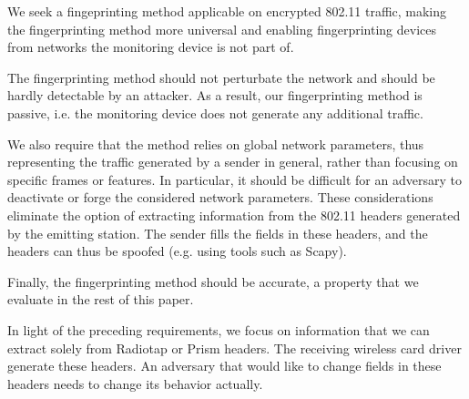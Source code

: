 \documentclass[10pt, conference, compsocconf, letterpaper]{IEEEtran}
\begin{document}
We seek a fingeprinting method applicable on encrypted 802.11 traffic, making the fingerprinting method more universal and enabling fingerprinting devices from networks the monitoring device is not part of.

The fingerprinting method should not perturbate the network and should be hardly detectable by an attacker. As a result, our fingerprinting method is passive, i.e. the monitoring device does not generate any additional traffic. 


We also require that the method relies on global network parameters, thus representing the traffic generated by a sender in general, rather than focusing on specific frames or features. In particular, it should be difficult for an adversary to deactivate or forge the considered network parameters. These considerations eliminate the option of extracting information from the 802.11 headers generated by the emitting station. The sender fills the fields in these headers, and the headers can thus be spoofed (e.g. using tools such as Scapy).

Finally, the fingerprinting method should be accurate, a property that we evaluate in the rest of this paper.


In light of the preceding requirements, we focus on information that we can extract solely from Radiotap \cite{radiotap.header} or Prism headers. 
The receiving wireless card driver generate these headers. An adversary that would like to change fields in these headers needs to change its behavior actually.
\end{document}
